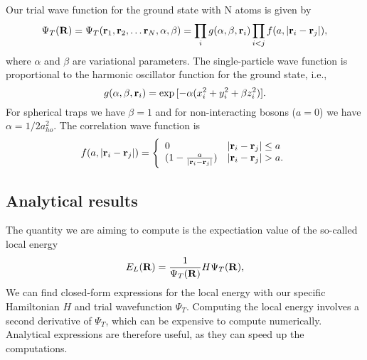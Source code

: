 \documentclass[english, a4paper]{article}
\begin{document}
 Our trial wave function for the ground state with N atoms is given by
  \begin{equation}
 \Psi_T({\bf R})=\Psi_T({\bf r}_1, {\bf r}_2, \dots {\bf r}_N,\alpha,\beta)=\prod_i g(\alpha,\beta,{\bf r}_i)\prod_{i<j}f(a,|{\bf r}_i-{\bf r}_j|),
 \label{trialwf}
 \end{equation}
 where $\alpha$ and $\beta$ are variational parameters.
 The single-particle wave function is proportional to the harmonic
 oscillator function for the ground state, i.e.,
 \begin{equation}
    g(\alpha,\beta,{\bf r}_i)= \exp{[-\alpha(x_i^2+y_i^2+\beta z_i^2)]}.
 \end{equation}
 For spherical traps we have $\beta = 1$ and for non-interacting
 bosons ($a=0$) we have $\alpha = 1/2a_{ho}^2$.  The correlation wave
 function is
 \begin{equation}
    f(a,|{\bf r}_i-{\bf r}_j|)=\Bigg\{
 \begin{array}{ll}
	 0 & {|{\bf r}_i-{\bf r}_j|} \leq {a}\\
	 (1-\frac{a}{|{\bf r}_i-{\bf r}_j|}) & {|{\bf r}_i-{\bf r}_j|} > {a}.
 \end{array}
 \end{equation}
 
 
\subsection{Analytical results}

The quantity we are aiming to compute is the expectiation value of the so-called local energy
 \begin{equation}
    E_L({\bf R})=\frac{1}{\Psi_T({\bf R})}H\Psi_T({\bf R}),
    \label{localenergy}
 \end{equation}
We can find closed-form expressions for the local energy with our specific Hamiltonian $H$ and trial wavefunction $\Psi_T$.
Computing the local energy involves a second derivative of $\Psi_T$, which can be expensive to compute numerically. 
Analytical expressions are therefore useful, as they can speed up the computations.\\
\end{document}
